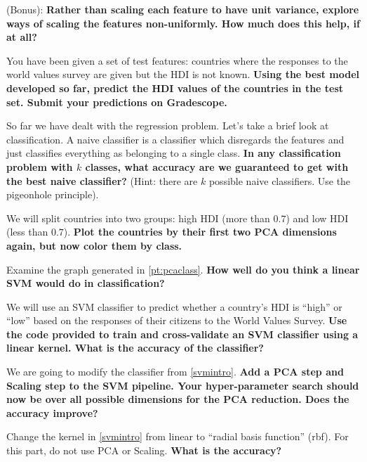 \begin{Parts}
\Part (Bonus): \textbf{Rather than scaling each feature to have unit variance, explore ways of scaling the features non-uniformly. How much does this help, if at all?}




\Part You have been given a set of test features: countries where the responses to the world values survey are given but the HDI is not known. \textbf{Using the best model developed so far, predict the HDI values of the countries in the test set. Submit your predictions on Gradescope.}




\Part So far we have dealt with the regression problem. Let's take a brief look at classification. A naive classifier is a classifier which disregards the features and just classifies everything as belonging to a single class. \textbf{In any classification problem with $k$ classes, what accuracy are we guaranteed to get with the best naive classifier?} (Hint: there are $k$ possible naive classifiers. Use the pigeonhole principle).




\Part \label{pt:pcaclass} We will split countries into two groups: high HDI (more than $0.7$) and low HDI (less than $0.7$). \textbf{Plot the countries by their first two PCA dimensions again, but now color them by class.}




\Part Examine the graph generated in \ref{pt:pcaclass}. \textbf{How well do you think a linear SVM would do in classification?} 




\Part \label{svmintro} We will use an SVM classifier to predict whether a country's HDI is ``high'' or ``low'' based on the responses of their citizens to the World Values Survey. \textbf{Use the code provided to train and cross-validate an SVM classifier using a linear kernel. What is the accuracy of the classifier?}




\Part We are going to modify the classifier from \ref{svmintro}. \textbf{Add a PCA step and Scaling step to the SVM pipeline. Your hyper-parameter search should now be over all possible dimensions for the PCA reduction. Does the accuracy improve?}




\Part Change the kernel in \ref{svmintro} from linear to ``radial basis function'' (rbf). For this part, do not use PCA or Scaling. \textbf{What is the accuracy?}





\end{Parts}
